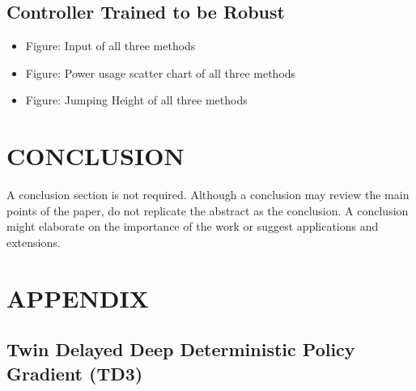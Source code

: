 \documentclass[letterpaper, 10 pt, conference]{ieeeconf}  %
\begin{document}
\subsection{Controller Trained to be Robust}
\begin{itemize}
        \item Figure: Input of all three methods
        \item Figure: Power usage scatter chart of all three methods
        \item Figure: Jumping Height of all three methods
\end{itemize}

\section{CONCLUSION}
A conclusion section is not required. Although a conclusion may review the main points of the paper, do not replicate the abstract as the conclusion. A conclusion might elaborate on the importance of the work or suggest applications and extensions. 

\addtolength{\textheight}{-12cm}   %







\section*{APPENDIX}
\subsection*{Twin Delayed Deep Deterministic Policy Gradient (TD3)} 
\end{document}
